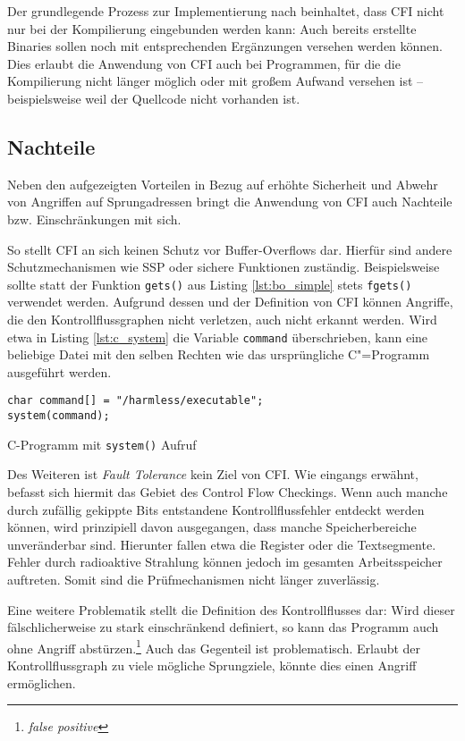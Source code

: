 Der grundlegende Prozess zur Implementierung nach \cite{Abadi.2009} beinhaltet, dass CFI nicht nur bei der Kompilierung eingebunden werden kann: Auch bereits erstellte Binaries sollen noch mit entsprechenden Ergänzungen versehen werden können. Dies erlaubt die Anwendung von CFI auch bei Programmen, für die die Kompilierung nicht länger möglich oder mit großem Aufwand versehen ist -- beispielsweise weil der Quellcode nicht vorhanden ist.


\subsection{Nachteile}
\label{sec:disadv}
Neben den aufgezeigten Vorteilen in Bezug auf erhöhte Sicherheit und Abwehr von Angriffen auf Sprungadressen bringt die Anwendung von CFI auch Nachteile bzw. Einschränkungen mit sich.

So stellt CFI an sich keinen Schutz vor Buffer-Overflows dar. Hierfür sind andere Schutzmechanismen wie SSP oder sichere Funktionen zuständig. Beispielsweise sollte statt der Funktion \texttt{gets()} aus Listing \ref{lst:bo_simple} stets \texttt{fgets()} verwendet werden. Aufgrund dessen und der Definition von CFI können Angriffe, die den Kontrollflussgraphen nicht verletzen, auch nicht erkannt werden. Wird etwa in Listing \ref{lst:c_system} die Variable \texttt{command} überschrieben, kann eine beliebige Datei mit den selben Rechten wie das ursprüngliche C"=Programm ausgeführt werden.

\begin{listing}[ht]
\begin{verbatim}
char command[] = "/harmless/executable";
system(command);
\end{verbatim}
\caption{C-Programm mit \texttt{system()} Aufruf}
\label{lst:c_system}
\end{listing}

Des Weiteren ist \emph{Fault Tolerance} kein Ziel von CFI. Wie eingangs erwähnt, befasst sich hiermit das Gebiet des Control Flow Checkings. Wenn auch manche durch zufällig gekippte Bits entstandene Kontrollflussfehler entdeckt werden können, wird prinzipiell davon ausgegangen, dass manche Speicherbereiche unveränderbar sind. Hierunter fallen etwa die Register oder die Textsegmente. Fehler durch radioaktive Strahlung können jedoch im gesamten Arbeitsspeicher auftreten. Somit sind die Prüfmechanismen nicht länger zuverlässig.

Eine weitere Problematik stellt die Definition des Kontrollflusses dar: Wird dieser fälschlicherweise zu stark einschränkend definiert, so kann das Programm auch ohne Angriff abstürzen.\footnote{\emph{false positive}} Auch das Gegenteil ist problematisch. Erlaubt der Kontrollflussgraph zu viele mögliche Sprungziele, könnte dies einen Angriff ermöglichen.


